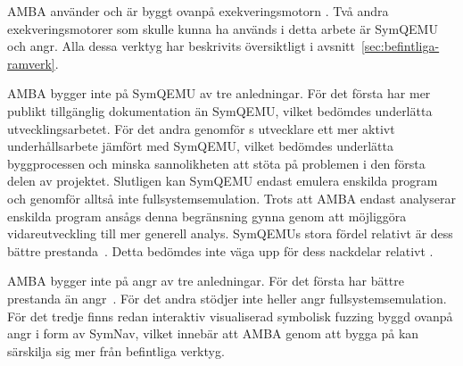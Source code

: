 AMBA använder och är byggt ovanpå exekveringsmotorn \stoe{}. Två andra
exekveringsmotorer som skulle kunna ha används i detta arbete är SymQEMU och
angr. Alla dessa verktyg har beskrivits översiktligt i
avsnitt~\ref{sec:befintliga-ramverk}.

AMBA bygger inte på SymQEMU av tre anledningar. För det första har \stoe{} mer
publikt tillgänglig dokumentation än SymQEMU, vilket bedömdes underlätta
utvecklingsarbetet. För det andra genomför \stoe{}s utvecklare ett mer aktivt
underhållsarbete jämfört med SymQEMU, vilket bedömdes underlätta byggprocessen
och minska sannolikheten att stöta på problemen i den första delen av projektet.
Slutligen kan SymQEMU endast emulera enskilda program och genomför alltså inte
fullsystemsemulation. Trots att AMBA endast analyserar enskilda program ansågs
denna begränsning gynna \stoe{} genom att möjliggöra vidareutveckling till mer
generell analys. SymQEMUs stora fördel relativt \stoe{} är dess bättre
prestanda~\cite{systematic_comparison_symbex}.  Detta bedömdes inte väga upp för
dess nackdelar relativt \stoe{}.

AMBA bygger inte på angr av tre anledningar. För det första har \stoe{} bättre
prestanda än angr~\cite{systematic_comparison_symbex}. För det andra stödjer
inte heller angr fullsystemsemulation. För det tredje finns redan interaktiv
visualiserad symbolisk fuzzing byggd ovanpå angr i form av SymNav, vilket
innebär att AMBA genom att bygga på \stoe{} kan särskilja sig mer från
befintliga verktyg.
